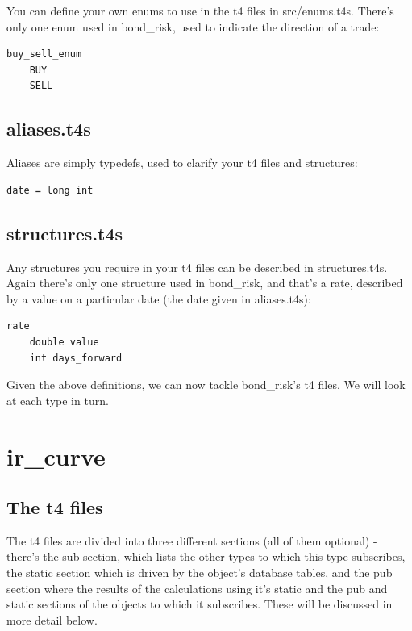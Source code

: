 \documentclass{report}
\begin{document}
You can define your own enums to use in the t4 files in src/enums.t4s. There's only one enum used in bond_risk, used to indicate the direction of a trade:

\begin{verbatim}
buy_sell_enum
    BUY
    SELL
\end{verbatim}

\subsection{aliases.t4s}

Aliases are simply typedefs, used to clarify your t4 files and structures:

\begin{verbatim}
date = long int
\end{verbatim}

\subsection{structures.t4s}

Any structures you require in your t4 files can be described in structures.t4s. Again there's only one structure used in bond_risk, and that's a rate, described by a value on a particular date (the date given in aliases.t4s):

\begin{verbatim}
rate
    double value
    int days_forward
\end{verbatim}

Given the above definitions, we can now tackle bond_risk's t4 files. We will look at each type in turn.

\section{ir_curve}

\subsection{The t4 files}

The t4 files are divided into three different sections (all of them optional) - there's the sub section, which lists the other types to which this type subscribes, the static section which is driven by the object's database tables, and the pub section where the results of the calculations using it's static and the pub and static sections of the objects to which it subscribes. These will be discussed in more detail below.
\end{document}
